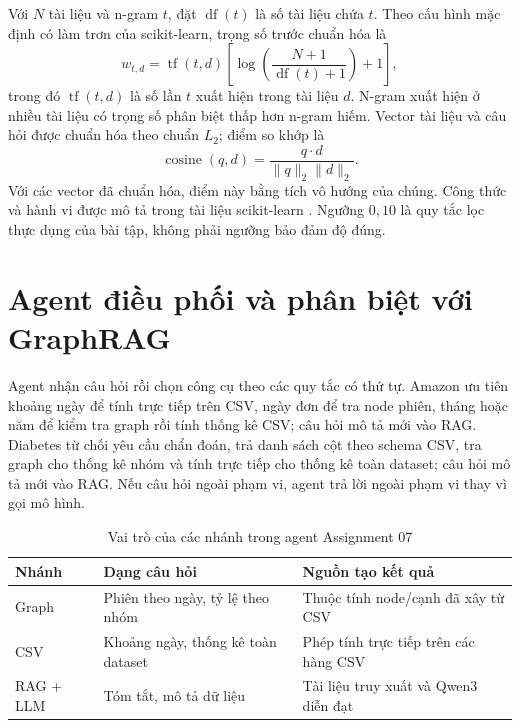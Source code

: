 \documentclass[12pt,a4paper]{report}
\newcommand{\codeinline}[1]{\texttt{\detokenize{#1}}}
\begin{document}
Với $N$ tài liệu và n-gram $t$, đặt $\operatorname{df}(t)$ là số tài liệu chứa $t$.
Theo cấu hình mặc định có làm trơn của scikit-learn, trọng số trước chuẩn hóa là
\begin{equation}
    w_{t,d}=\operatorname{tf}(t,d)
    \left[\log\!\left(\frac{N+1}{\operatorname{df}(t)+1}\right)+1\right],
\end{equation}
trong đó $\operatorname{tf}(t,d)$ là số lần $t$ xuất hiện trong tài liệu $d$.
N-gram xuất hiện ở nhiều tài liệu có trọng số phân biệt thấp hơn n-gram hiếm.
Vector tài liệu và câu hỏi được chuẩn hóa theo chuẩn $L_2$; điểm so khớp là
\begin{equation}
    \operatorname{cosine}(q,d)=
    \frac{q\cdot d}{\lVert q\rVert_2\lVert d\rVert_2}.
\end{equation}
Với các vector đã chuẩn hóa, điểm này bằng tích vô hướng của chúng. Công thức và
hành vi \codeinline{TfidfVectorizer} được mô tả trong tài liệu scikit-learn
\cite{sklearn_tfidf}. Ngưỡng $0{,}10$ là quy tắc lọc thực dụng của bài tập, không
phải ngưỡng bảo đảm độ đúng.

\section{Agent điều phối và phân biệt với GraphRAG}
Agent nhận câu hỏi rồi chọn công cụ theo các quy tắc có thứ tự. Amazon ưu tiên
khoảng ngày để tính trực tiếp trên CSV, ngày đơn để tra node phiên, tháng hoặc
năm để kiểm tra graph rồi tính thống kê CSV; câu hỏi mô tả mới vào RAG. Diabetes
từ chối yêu cầu chẩn đoán, trả danh sách cột theo schema CSV, tra graph cho thống kê nhóm và tính
trực tiếp cho thống kê toàn dataset; câu hỏi mô tả mới vào RAG. Nếu câu hỏi ngoài
phạm vi, agent trả lời ngoài phạm vi thay vì gọi mô hình.

\begin{table}[H]
\centering
\caption{Vai trò của các nhánh trong agent Assignment 07}
\label{tab:theory_agent_routes}
\begin{tabularx}{\textwidth}{p{2.6cm}XX}
\toprule
\textbf{Nhánh} & \textbf{Dạng câu hỏi} & \textbf{Nguồn tạo kết quả} \\
\midrule
Graph & Phiên theo ngày, tỷ lệ theo nhóm & Thuộc tính node/cạnh đã xây từ CSV \\
CSV & Khoảng ngày, thống kê toàn dataset & Phép tính trực tiếp trên các hàng CSV \\
RAG + LLM & Tóm tắt, mô tả dữ liệu & Tài liệu truy xuất và Qwen3 diễn đạt \\
\bottomrule
\end{tabularx}
\end{table}
\end{document}

